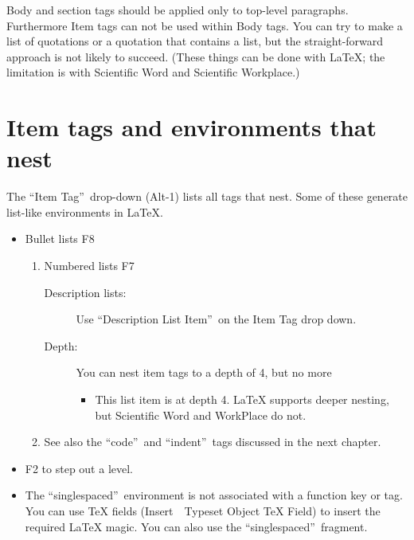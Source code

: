 Body and section tags should be applied only to top-level paragraphs.
Furthermore Item tags can not be used within Body tags. You can try to make
a list of quotations or a quotation that contains a list, but the
straight-forward approach is not likely to succeed. (These things can be
done with LaTeX; the limitation is with Scientific Word and Scientific
Workplace.)

\section{Item tags and environments that nest}

The \textquotedblleft Item Tag\textquotedblright\ drop-down (Alt-1) lists
all tags that nest. Some of these generate list-like environments in LaTeX.

\begin{itemize}
\item Bullet lists F8

\begin{enumerate}
\item Numbered lists F7

\begin{description}
\item[Description lists:] Use \textquotedblleft Description List
Item\textquotedblright\ on the Item Tag drop down.

\item[Depth:] You can nest item tags to a depth of 4, but no more

\begin{itemize}
\item This list item is at depth 4. LaTeX supports deeper nesting, but
Scientific Word and WorkPlace do not.
\end{itemize}
\end{description}

\item See also the \textquotedblleft code\textquotedblright\ and
\textquotedblleft indent\textquotedblright\ tags discussed in the next
chapter.
\end{enumerate}

\item F2 to step out a level.

\item 
\begin{singlespaced}%
The \textquotedblleft singlespaced\textquotedblright\ environment is not
associated with a function key or tag. You can use TeX fields (Insert\ 
\TEXTsymbol{>}\TEXTsymbol{>}\ Typeset Object \TEXTsymbol{>}\TEXTsymbol{>}
TeX Field) to insert the required LaTeX magic. You can also use the
\textquotedblleft singlespaced\textquotedblright\ fragment.%
\end{singlespaced}%
\end{itemize}


